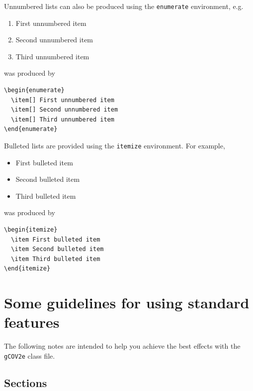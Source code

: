 \documentclass{gCOV2e}
\theoremstyle{plain}%
\theoremstyle{definition}
\theoremstyle{remark}
\begin{document}
Unnumbered lists can also be produced using the \texttt{enumerate} environment, e.g.
\begin{enumerate}
  \item[] First unnumbered item
  \item[] Second unnumbered item
  \item[] Third unnumbered item
\end{enumerate}
was produced by
\begin{verbatim}
\begin{enumerate}
  \item[] First unnumbered item
  \item[] Second unnumbered item
  \item[] Third unnumbered item
\end{enumerate}
\end{verbatim}

Bulleted lists are provided using the \texttt{itemize} environment. For example,
\begin{itemize}
  \item First bulleted item
  \item Second bulleted item
  \item Third bulleted item
\end{itemize}
was produced by
\begin{verbatim}
\begin{itemize}
  \item First bulleted item
  \item Second bulleted item
  \item Third bulleted item
\end{itemize}
\end{verbatim}


\section{Some guidelines for using standard features}

The following notes are intended to help you achieve the best effects with the \texttt{gCOV2e} class file.


\subsection{Sections}
\end{document}
